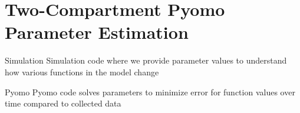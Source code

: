 \section{Two-Compartment Pyomo Parameter Estimation}

\begin{frame}{Simulation}
    Simulation code where we provide parameter values to understand how various functions in the model change
\end{frame}

\begin{frame}{Pyomo}
    Pyomo code solves parameters to minimize error for function values over time compared to collected data
\end{frame}